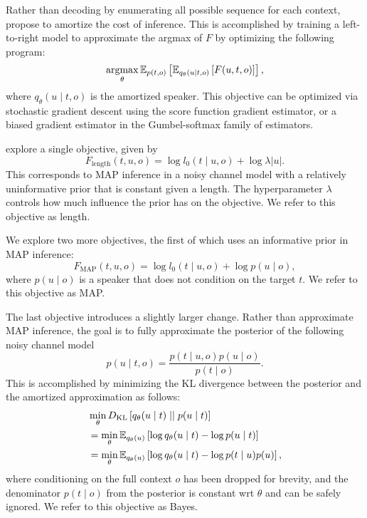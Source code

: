 \documentclass[11pt,a4paper]{article}
\newcommand\qtheta{q_\theta}
\begin{document}
Rather than decoding by enumerating all possible sequence for each context,
\citet{white2020learning} propose to amortize the cost of inference.
This is accomplished by training a left-to-right model to approximate the argmax of $F$
by optimizing the following program:  
\begin{equation}
\operatorname*{argmax}_\theta \mathbb{E}_{p(t,o)}\left[\mathbb{E}_{q_\theta(u\mid t,o)}\left[F(u,t,o)\right]\right],
\end{equation}
where $q_\theta(u \mid t, o)$ is the amortized speaker.
This objective can be optimized via stochastic gradient descent using the 
score function gradient estimator, or a biased gradient estimator in the Gumbel-softmax
family of estimators.

\citet{white2020learning} explore a single objective, given by
\begin{equation}
F_{\textrm{length}}(t,u,o) = \log l_0(t\mid u,o)  + \log \lambda|u|.
\end{equation}
This corresponds to MAP inference in a noisy channel model with
a relatively uninformative prior that is constant given a length.
The hyperparameter $\lambda$ controls how much influence the prior has on the objective.
We refer to this objective as length.

We explore two more objectives, the first of which uses an informative prior in MAP inference:
\begin{equation}
F_{\textrm{MAP}}(t,u,o) = \log l_0(t\mid u,o) + \log p(u\mid o),
\end{equation}
where $p(u \mid o)$ is a speaker that does not condition on the target $t$.
We refer to this objective as MAP.

The last objective introduces a slightly larger change.
Rather than approximate MAP inference,
the goal is to fully approximate the posterior of the following noisy channel model
$$p(u \mid t,o) = \frac{p(t \mid u, o)p(u \mid o)}{p(t \mid o)}.$$
This is accomplished by minimizing the KL divergence between the posterior
and the amortized approximation as follows:
\begin{equation}
\label{eqn:bayes}
\begin{aligned}
&\min_\theta \KL{\qtheta(u\mid t) \;||\; p(u\mid t)}\\
&= \min_\theta \Es{\qtheta(u)}{\log \qtheta(u\mid t) - \log p(u\mid t)}\\
&= \min_\theta \Es{\qtheta(u)}{\log \qtheta(u\mid t) - \log p(t \mid u)p(u)},
\end{aligned}
\end{equation}
where conditioning on the full context $o$ has been dropped for brevity,
and the denominator $p(t\mid o)$ from the posterior is constant wrt $\theta$
and can be safely ignored.
We refer to this objective as Bayes.
\end{document}
